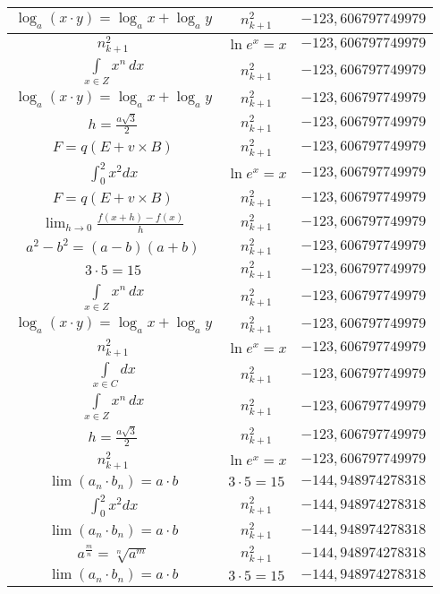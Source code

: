 \documentclass{article}
\begin{document}
\begin{flushleft}
\begin{longtable}{|c|c|c|}
$\log_{a}(x\cdot y)=\log_{a}x+\log_{a}y$ & $n_{k+1}^2$ & $-123,606797749979$ \\ \hline 
$n_{k+1}^2$ & $\ln e^x=x$ & $-123,606797749979$ \\ \hline 
$\int \limits_{x\in Z}\!x^{n}\,dx$ & $n_{k+1}^2$ & $-123,606797749979$ \\ \hline 
$\log_{a}(x\cdot y)=\log_{a}x+\log_{a}y$ & $n_{k+1}^2$ & $-123,606797749979$ \\ \hline 
$h=\frac{a\sqrt{3}}{2}$ & $n_{k+1}^2$ & $-123,606797749979$ \\ \hline 
$F=q\left(E+v\times B\right)$ & $n_{k+1}^2$ & $-123,606797749979$ \\ \hline 
$\int _0^2x^2dx$ & $\ln e^x=x$ & $-123,606797749979$ \\ \hline 
$F=q\left(E+v\times B\right)$ & $n_{k+1}^2$ & $-123,606797749979$ \\ \hline 
$\lim_{h\to0}\frac{f(x+h)-f(x)}{h}$ & $n_{k+1}^2$ & $-123,606797749979$ \\ \hline 
$a^2-b^2=(a-b)(a+b)$ & $n_{k+1}^2$ & $-123,606797749979$ \\ \hline 
$3\cdot 5=15$ & $n_{k+1}^2$ & $-123,606797749979$ \\ \hline 
$\int \limits_{x\in Z}\!x^{n}\,dx$ & $n_{k+1}^2$ & $-123,606797749979$ \\ \hline 
$\log_{a}(x\cdot y)=\log_{a}x+\log_{a}y$ & $n_{k+1}^2$ & $-123,606797749979$ \\ \hline 
$n_{k+1}^2$ & $\ln e^x=x$ & $-123,606797749979$ \\ \hline 
$\int \limits_{x\in C}dx$ & $n_{k+1}^2$ & $-123,606797749979$ \\ \hline 
$\int \limits_{x\in Z}\!x^{n}\,dx$ & $n_{k+1}^2$ & $-123,606797749979$ \\ \hline 
$h=\frac{a\sqrt{3}}{2}$ & $n_{k+1}^2$ & $-123,606797749979$ \\ \hline 
$n_{k+1}^2$ & $\ln e^x=x$ & $-123,606797749979$ \\ \hline 
$\lim\left(a_n\cdot b_n\right)=a\cdot b$ & $3\cdot 5=15$ & $-144,948974278318$ \\ \hline 
$\int _0^2x^2dx$ & $n_{k+1}^2$ & $-144,948974278318$ \\ \hline 
$\lim\left(a_n\cdot b_n\right)=a\cdot b$ & $n_{k+1}^2$ & $-144,948974278318$ \\ \hline 
$a^{\frac{m}{n}}=\sqrt[n]{a^{m}}$ & $n_{k+1}^2$ & $-144,948974278318$ \\ \hline 
$\lim\left(a_n\cdot b_n\right)=a\cdot b$ & $3\cdot 5=15$ & $-144,948974278318$ \\ \hline 

\end{longtable}
\end{flushleft}
\end{document}
